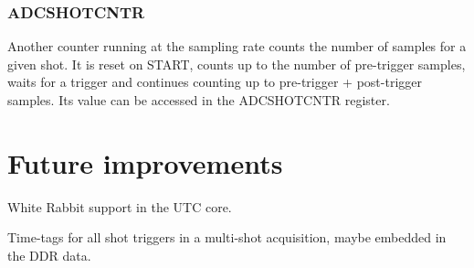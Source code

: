 \documentclass{article}
\newenvironment{packed_item}{
\begin{itemize}
  \setlength{\itemsep}{1pt}
  \setlength{\parskip}{0pt}
  \setlength{\parsep}{0pt}
}{\end{itemize}}
\begin{document}
\subsubsection{ADCSHOTCNTR}
Another counter running at the sampling rate counts the number of samples for a given shot. It is reset on START, counts up to the number of pre-trigger samples, waits for a trigger and continues counting up to pre-trigger + post-trigger samples. Its value can be accessed in the ADCSHOTCNTR register.

\section{Future improvements}
\begin{packed_item}
\item White Rabbit support in the UTC core.
\item Time-tags for all shot triggers in a multi-shot acquisition, maybe embedded in the DDR data.
\end{packed_item}
\end{document}
